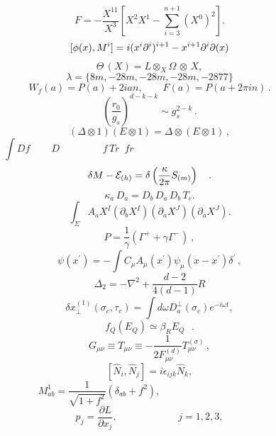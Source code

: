 \documentclass{article}
\begin{document}
$$F = - \frac { X ^ { 1 1 } } { X ^ { 3 } } \left [ X ^ { 2 } X ^ { 1 } - \sum _ { i = 3 } ^ { n + 1 } ( X ^ { 0 } ) ^ { 2 } \right ] .$$
$$[ \phi ( x ) , M ^ { i } ] = i ( x ^ { i } \partial ^ { i } ) ^ { i + 1 } - x ^ { i + 1 } \partial ^ { i } \partial _ { { \bf } } ( x )$$
$$\Theta \, ( X ) = L \otimes _ { X } \Omega \, \otimes \, X ,$$
$$\lambda = \{ 8 m , - 2 8 m , - 2 8 m , - 2 8 m , - 2 8 7 7 \}$$
$$W _ { f } ( a ) = P ( a ) + 2 i a n , \qquad F ( a ) = P ( a + 2 \pi i n ) \, .$$
$$\left ( \frac { r _ { 0 } } { g _ { s } } \right ) ^ { d - k - k } \sim g _ { s } ^ { 2 - k } \, .$$
$$( \Delta \otimes 1 ) ( E \otimes 1 ) = \Delta \otimes ( E \otimes 1 ) \, ,$$
$$\int D f \, \, \, \, \, \, \, \, \, \, \, \, \, D \, \, \, \, \, \, \, \, \, \, \, \, \, \, \, \, \, \, \, \, \, \, \, \, \, \, f \, T r \, \, \, f r \, \, \, \, \, \, \, \, \, \, \, \, \, \, \, \, \, \, \, \, \, \, \, \, \, \, \, \, \, \, \, \, \, \, \, \, \, \, \, \, \, \, \, \, \, \, \, \, \, \, \, \, \, \, \, \, \, \, \, \, \, \, \, \, \, \, \, \, \, \, \, \, \, \, \, \, \, \, \, \, \, \, \, \, \, \, \, \, \, \, \, \, \, \, \, \, \, \,$$
$$\delta M - { \cal E } _ { ( h ) } = \delta \left ( \frac { \kappa } { 2 \pi } S _ { ( m ) } \right ) \quad .$$
$$\kappa _ { a } \, D _ { a } = D _ { b } \, D _ { a } \, D _ { b } \, T _ { c } .$$
$$\int _ { \Sigma } A _ { a } X ^ { I } ( \partial _ { b } X ^ { I } ) ( \partial _ { a } X ^ { J } ) ( \partial _ { a } X ^ { J } ) .$$
$$P = \frac { 1 } { \gamma } ( \Gamma ^ { + } + \gamma \Gamma ^ { - } ) \ ,$$
$$\psi ( x ^ { \prime } ) = - \int C _ { \mu } A _ { \mu } ( x ^ { \prime } ) \psi _ { \mu } ( x - x ^ { \prime } ) \delta ^ { \prime } \, ,$$
$$\Delta _ { 2 } = - \nabla ^ { 2 } + \frac { d - 2 } { 4 ( d - 1 ) } R$$
$$\delta x _ { \perp } ^ { ( 1 ) } ( \sigma _ { c } , \tau _ { c } ) = \int d \omega D _ { a } ^ { \perp } ( \sigma _ { c } ) e ^ { - i \omega t } ,$$
$$f _ { Q } ( E _ { Q } ) \simeq \beta _ { R } E _ { Q } ~ ~ ~ .$$
$$G _ { \mu \nu } \equiv T _ { \mu \nu } \equiv - \frac { 1 } { 2 F _ { \mu \nu } ^ { ( d ) } } T _ { \mu \nu } ^ { ( \sigma ) } \, ,$$
$$[ \hat { N } _ { i } , \hat { N } _ { j } ] = i \epsilon _ { i j k } \hat { N } _ { k } ,$$
$$M _ { a b } ^ { 1 } = \frac { 1 } { \sqrt { 1 + f ^ { 2 } } } ( \delta _ { a b } + f ^ { 2 } ) , \quad \, \, \, \, \, \, \, \, \, \, \, \, \, \, \, \, \, \, \, \, \, \, \, \, \, \, \, \, \, \, \, \, \, \, \, \, \, \, \, \, \, \, \, \, \, \, \, \, \, \, \, \, \, \, \,$$
$$p _ { j } = \frac { \partial L } { \partial x _ { j } } , \; \; \; \; \; \; \; \; \; \; \; \; \; \; \; \; \; \; \; \; \; \; j = 1 , 2 , 3 ,$$
\end{document}
